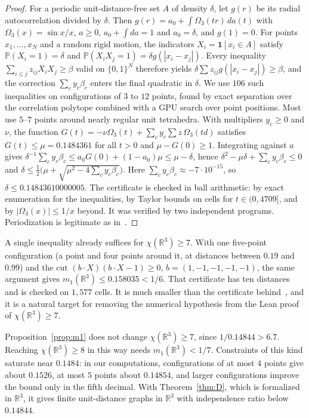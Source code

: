 \documentclass[11pt]{amsart}
\theoremstyle{definition}
\newcommand{\R}{\mathbb{R}}
\newcommand{\PP}{\mathbb{P}}
\begin{document}
\begin{proof}
For a periodic unit-distance-free set $A$ of density $\delta$, let $g(r)$ be its radial autocorrelation divided by $\delta$. Then $g(r)=a_0+\int\Omega_3(tr)\,da(t)$ with $\Omega_3(x)=\sin x/x$, $a\ge0$, $a_0+\int da=1$ and $a_0=\delta$, and $g(1)=0$. For points $x_1,\dots,x_N$ and a random rigid motion, the indicators $X_i=\mathbf 1[x_i\in A]$ satisfy $\PP(X_i=1)=\delta$ and $\PP(X_iX_j=1)=\delta g(|x_i-x_j|)$. Every inequality $\sum_{i\le j}z_{ij}X_iX_j\ge\beta$ valid on $\{0,1\}^N$ therefore yields $\delta\sum z_{ij}g(|x_i-x_j|)\ge\beta$, and the correction $\sum_cy_c\beta_c$ enters the final quadratic in $\delta$. We use $106$ such inequalities on configurations of $3$ to $12$ points, found by exact separation over the correlation polytope combined with a GPU search over point positions. Most use $5$--$7$ points around nearly regular unit tetrahedra. With multipliers $y_c\ge0$ and $\nu$, the function $G(t)=-\nu\Omega_3(t)+\sum_cy_c\sum z\,\Omega_3(td)$ satisfies $G(t)\le\mu=0.1484361$ for all $t>0$ and $\mu-G(0)\ge1$. Integrating against $a$ gives $\delta^{-1}\sum_cy_c\beta_c\le a_0G(0)+(1-a_0)\mu\le\mu-\delta$, hence $\delta^2-\mu\delta+\sum_cy_c\beta_c\le0$ and $\delta\le\tfrac12\bigl(\mu+\sqrt{\mu^2-4\sum_cy_c\beta_c}\bigr)$. Here $\sum_cy_c\beta_c\approx-7\cdot10^{-15}$, so $\delta\le0.14843610000005$. The certificate is checked in ball arithmetic: by exact enumeration for the inequalities, by Taylor bounds on cells for $t\in(0,4709]$, and by $|\Omega_3(x)|\le1/x$ beyond. It was verified by two independent programs. Periodization is legitimate as in~\cite[Lemma 2.2]{Crocker}.
\end{proof}

A single inequality already suffices for $\chi(\R^3)\ge7$. With one five-point configuration (a point and four points around it, at distances between $0.19$ and $0.99$) and the cut $(b\cdot X)(b\cdot X-1)\ge0$, $b=(1,-1,-1,-1,-1)$, the same argument gives $m_1(\R^3)\le0.158035<1/6$. That certificate has ten distances and is checked on $1{,}577$ cells. It is much smaller than the certificate behind~\cite[Table 2]{DOV}, and it is a natural target for removing the numerical hypothesis from the Lean proof of $\chi(\R^3)\ge7$.

Proposition~\ref{prop:m1} does not change $\chi(\R^3)\ge7$, since $1/0.14844>6.7$. Reaching $\chi(\R^3)\ge8$ in this way needs $m_1(\R^3)<1/7$. Constraints of this kind saturate near $0.1484$: in our computations, configurations of at most $4$ points give about $0.1526$, at most $5$ points about $0.14854$, and larger configurations improve the bound only in the fifth decimal. With Theorem~\ref{thm:D}, which is formalized in $\R^3$, it gives finite unit-distance graphs in $\R^3$ with independence ratio below $0.14844$.
\end{document}
